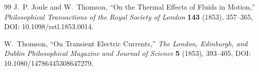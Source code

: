 \begin{thebibliography}{99}
J.~P. Joule and W.~Thomson,
``On the Thermal Effects of Fluids in Motion,''
\emph{Philosophical Transactions of the Royal Society of London} \textbf{143} (1853), 357--365,
DOI: 10.1098/rstl.1853.0014.

W.~Thomson,
``On Transient Electric Currents,''
\emph{The London, Edinburgh, and Dublin Philosophical Magazine and Journal of Science} \textbf{5} (1853), 393--405,
DOI: 10.1080/14786445308647279.
\end{thebibliography}
